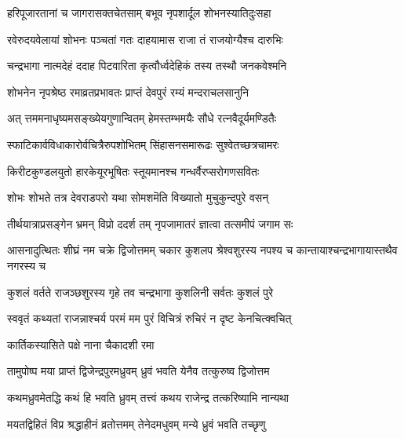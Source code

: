 \twolineshloka
{हरिपूजारतानां च जागरासक्तचेतसाम्}
{बभूव नृपशार्दूल शोभनस्यातिदुःसहा} %

\twolineshloka
{रवेरुदयवेलायां शोभनः पञ्चतां गतः}
{दाहयामास राजा तं राजयोग्यैश्च दारुभिः} %

\twolineshloka
{चन्द्रभागा नात्मदेहं ददाह पिटवारिता}
{कृत्वौर्ध्वदेहिकं तस्य तस्थौ जनकवेश्मनि} %

\twolineshloka
{शोभनेन नृपश्रेष्ठ रमाव्रतप्रभावतः}
{प्राप्तं देवपुरं रम्यं मन्दराचलसानुनि} %

\twolineshloka
{अत् त्तममनाधृष्यमसङ्ख्येयगुणान्वितम्}
{हेमस्तम्भमयैः सौधे रत्नवैदूर्यमण्डितैः} %

\twolineshloka
{स्फाटिकार्वविधाकारोर्वचित्रैरुपशोभितम्}
{सिंहासनसमारूढः सुश्वेतच्छत्रचामरः} %

\twolineshloka
{किरीटकुण्डलयुतो हारकेयूरभूषितः}
{स्तूयमानश्च गन्धर्वैरप्सरोगणसवितः} %

\twolineshloka
{शोभः शोभते तत्र देवराडपरो यथा}
{सोमशमॆति विख्यातो मुचुकुन्दपुरे वसन्} %

\twolineshloka
{तीर्थयात्राप्रसङ्गेन भ्रमन् विप्रो ददर्श तम्}
{नृपजामातरं ज्ञात्वा तत्समीपं जगाम सः} %


\threelineshloka
{आसनादुत्थितः शीघ्रं नम चक्रे द्विजोत्तमम्}
{चकार कुशलप श्रेश्वशुरस्य नपश्य च}
{कान्तायाश्चन्द्रभागायास्तथैव नगरस्य च} %


\twolineshloka
{कुशलं वर्तते राजञ्छशुरस्य गृहे तव}
{चन्द्रभागा कुशलिनी सर्वतः कुशलं पुरे} %

\twolineshloka
{स्ववृतं कथ्यतां राजन्नाश्चर्य परमं मम}
{पुरं विचित्रं रुचिरं न दृष्ट केनचित्क्वचित्} %



\onelineshloka
{कार्तिकस्यासिते पक्षे नाना चैकादशी रमा} %

\twolineshloka
{तामुपोष्प मया प्राप्तं द्विजेन्द्रपुरमध्रुवम्}
{ध्रुवं भवति येनैव तत्कुरुष्व द्विजोत्तम} %


\twolineshloka
{कथमध्रुवमेतद्धि कथं हि भवति ध्रुवम्}
{तत्त्वं कथय राजेन्द्र तत्करिष्यामि नान्यथा} %


\twolineshloka
{मयतद्विहितं विप्र श्रद्धाहीनं व्रतोत्तमम्}
{तेनेदमधुवम् मन्ये ध्रुवं भवति तच्छृणु} %

